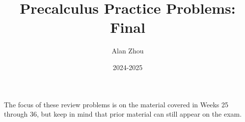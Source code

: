 \documentclass{article}
\title{Precalculus Practice Problems: Final}
\author{Alan Zhou}
\date{2024-2025}
\begin{document}
\maketitle

The focus of these review problems is on the material covered in Weeks 25 through 36, but keep in mind that prior material can still appear on the exam.

\tableofcontents


%
%
%
%
\end{document}
